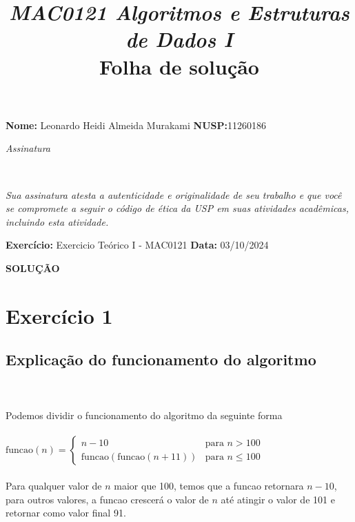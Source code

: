 \documentclass[11pt,reqno,a4paper]{amsart}
\def\Assin#1{\noindent\textit{Assinatura}\strut\\%
\framebox[\textwidth]{\phantom{\vrule height#1}}}
\begin{document}
\parindent=0pt

\title{\textsl{
    MAC0121 Algoritmos e Estruturas de Dados I}\\\vspace{3\jot}
  Folha de solução}
\author[MAC0122 Folha de solução]{}

\maketitle
\thispagestyle{empty} 
\pagestyle{plain}
\onehalfspace

\textbf{Nome:} Leonardo Heidi Almeida Murakami\enspace \hfill \enspace
\textbf{NUSP:}11260186\enspace\hfill

\medskip
\Assin{1cm}

\medskip \textit{Sua assinatura atesta a autenticidade e
  originalidade de seu trabalho e que você se compromete a seguir o
  código de ética da USP em suas atividades acadêmicas, incluindo esta
  atividade.}

\bigskip
\textbf{Exercício:} Exercicio Teórico I - MAC0121\enspace\hfill\enspace
\textbf{Data:} 03/10/2024\enspace

\bigskip
\noindent\textbf{SOLUÇÃO}

\section{Exercício 1}

\subsection{Explicação do funcionamento do algoritmo}

\begin{answer} 
\ 
\\
\\
Podemos dividir o funcionamento do algoritmo da seguinte forma
\\
\\
\begin{math}
    \text{funcao}(n) = 
\begin{cases} 
n - 10 & \text{para } n > 100 \\
\text{funcao}(\text{funcao}(n + 11)) & \text{para } n \leq 100
\end{cases}
\end{math}
\\
\\
Para qualquer valor de $n$ maior que 100, temos que a funcao retornara $n-10$, para outros valores, a funcao crescerá o valor de $n$ até atingir o valor de 101 e retornar como valor final 91.

\end{answer}
\end{document}
